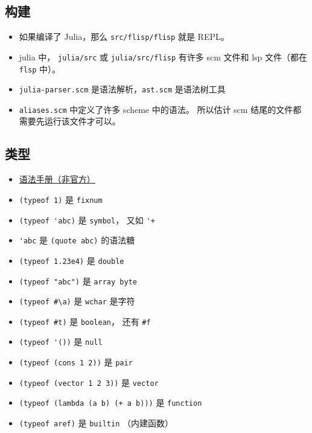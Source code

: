 
\subsection{构建}
\begin{itemize}
\item 如果编译了 Julia，那么 \verb`src/flisp/flisp` 就是 REPL。
\item julia 中， \verb`julia/src` 或 \verb`julia/src/flisp` 有许多 scm 文件和 lsp 文件（都在 \verb`flsp` 中）。
\item \verb`julia-parser.scm` 是语法解析，\verb`ast.scm` 是语法树工具
\item \verb`aliases.scm` 中定义了许多 scheme 中的语法。 所以估计 scm 结尾的文件都需要先运行该文件才可以。
\end{itemize}


\subsection{类型}
\begin{itemize}
\item \href{https://code.google.com/archive/p/femtolisp/wikis/Manual.wiki}{语法手册（非官方）}
\item \verb`(typeof 1)` 是 \verb`fixnum`
\item \verb`(typeof 'abc)` 是 \verb`symbol`， 又如 \verb`'+`
\item \verb`'abc` 是 \verb`(quote abc)` 的语法糖
\item \verb`(typeof 1.23e4)` 是 \verb`double`
\item \verb`(typeof "abc")` 是 \verb`array byte`
\item \verb`(typeof #\a)` 是 \verb`wchar` 是字符
\item \verb`(typeof #t)` 是 \verb`boolean`， 还有 \verb`#f`
\item \verb`(typeof '())` 是 \verb`null`
\item \verb`(typeof (cons 1 2))` 是 \verb`pair`
\item \verb`(typeof (vector 1 2 3))` 是 \verb`vector`
\item \verb`(typeof (lambda (a b) (+ a b)))` 是 \verb`function`
\item \verb`(typeof aref)` 是 \verb`builtin` （内建函数）
\end{itemize}

